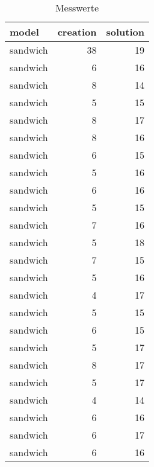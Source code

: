 \begin{table}
\centering
\caption{Messwerte}
\begin{tabular}{lrr}
\toprule
                           model &  creation &  solution \\
\midrule
                        sandwich &        38 &        19 \\
                        sandwich &         6 &        16 \\
                        sandwich &         8 &        14 \\
                        sandwich &         5 &        15 \\
                        sandwich &         8 &        17 \\
                        sandwich &         8 &        16 \\
                        sandwich &         6 &        15 \\
                        sandwich &         5 &        16 \\
                        sandwich &         6 &        16 \\
                        sandwich &         5 &        15 \\
                        sandwich &         7 &        16 \\
                        sandwich &         5 &        18 \\
                        sandwich &         7 &        15 \\
                        sandwich &         5 &        16 \\
                        sandwich &         4 &        17 \\
                        sandwich &         5 &        15 \\
                        sandwich &         6 &        15 \\
                        sandwich &         5 &        17 \\
                        sandwich &         8 &        17 \\
                        sandwich &         5 &        17 \\
                        sandwich &         4 &        14 \\
                        sandwich &         6 &        16 \\
                        sandwich &         6 &        17 \\
                        sandwich &         6 &        16 \\

\end{tabular}
\end{table}
